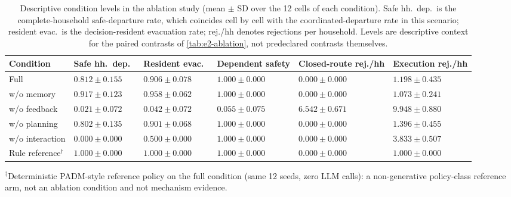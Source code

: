 \documentclass[journal]{IEEEtran}
\begin{document}
\begin{table}[t]
\centering
\scriptsize
\caption{Descriptive condition levels in the ablation study (mean $\pm$ SD over
the 12 cells of
each condition). Safe hh.\ dep.\ is the complete-household safe-departure rate,
which coincides cell by cell with the coordinated-departure rate in this
scenario; resident evac.\ is the decision-resident evacuation rate; rej./hh
denotes rejections per household. Levels are descriptive context for the paired
contrasts of \cref{tab:e2-ablation}, not predeclared contrasts themselves.}
\label{tab:e2-levels}
\begin{tabularx}{\textwidth}{@{}lZZZZZ@{}}
\toprule
Condition & Safe hh.\ dep.\ & Resident evac.\ & Dependent safety &
Closed-route rej./hh & Execution rej./hh \\
\midrule
Full & $0.812 \pm 0.155$ & $0.906 \pm 0.078$ & $1.000 \pm 0.000$ &
$0.000 \pm 0.000$ & $1.198 \pm 0.435$ \\
w/o memory & $0.917 \pm 0.123$ & $0.958 \pm 0.062$ & $1.000 \pm 0.000$ &
$0.000 \pm 0.000$ & $1.073 \pm 0.241$ \\
w/o feedback & $0.021 \pm 0.072$ & $0.042 \pm 0.072$ & $0.055 \pm 0.075$ &
$6.542 \pm 0.671$ & $9.948 \pm 0.880$ \\
w/o planning & $0.802 \pm 0.135$ & $0.901 \pm 0.068$ & $1.000 \pm 0.000$ &
$0.000 \pm 0.000$ & $1.396 \pm 0.455$ \\
w/o interaction & $0.000 \pm 0.000$ & $0.500 \pm 0.000$ & $1.000 \pm 0.000$ &
$0.000 \pm 0.000$ & $3.833 \pm 0.507$ \\
\midrule
Rule reference$^{\dagger}$ & $1.000 \pm 0.000$ & $1.000 \pm 0.000$ &
$1.000 \pm 0.000$ & $0.000 \pm 0.000$ & $1.000 \pm 0.000$ \\
\bottomrule
\end{tabularx}
\begin{minipage}{\textwidth}
\vspace{2pt}\scriptsize $^{\dagger}$Deterministic PADM-style reference policy
on the full condition (same 12 seeds, zero LLM calls): a non-generative
policy-class reference arm, not an ablation condition and not mechanism
evidence.
\end{minipage}
\end{table}
\end{document}
